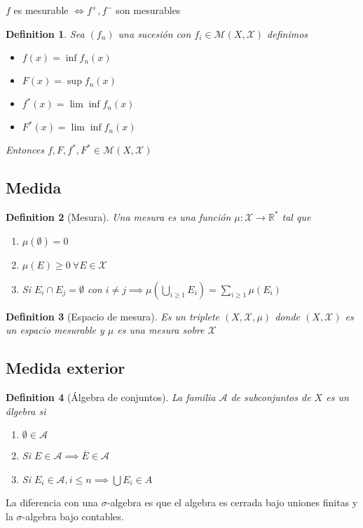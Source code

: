 \documentclass{myclass}
\newtheorem*{definition}{Definition}
\begin{document}
$f$ es mesurable  $\iff f^+, f^-$ son mesurables

\begin{definition}
  Sea $(f_n)$ una sucesión con  $f_i\in \mathcal{M}(X, \mathcal{X})$ definimos
  \begin{itemize}[topsep=-6pt, itemsep=0pt]
    \item $f(x) =  \inf f_n(x)$
    \item $F(x) =  \sup f_n(x)$
    \item $f^*(x) =  \lim \inf f_n(x)$
    \item $F^*(x) =  \lim \inf f_n(x)$
  \end{itemize}
  Entonces $f, F, f^*, F^* \in \mathcal{M}(X, \mathcal{X})$
\end{definition}

\subsection{Medida}
\begin{definition}[Mesura] Una mesura es una función $\mu : \mathcal{X}\to \mathbb{R}^*$ tal que
  \begin{enumerate}[topsep=-6pt, itemsep=0pt]
    \item $\mu(\emptyset) = 0$
	\item  $\mu(E)\ge 0 \ \forall E \in \mathcal{X}$ 
	\item Si $E_i \cap E_j = \emptyset$ con $i\neq j \implies \displaystyle \mu\left( \bigcup_{i\ge 1} E_i \right) = \sum_{i\ge 1}\mu(E_{i})  $
  \end{enumerate}
\end{definition}

\begin{definition}[Espacio de mesura] Es un triplete $(X, \mathcal{X}, \mu)$ donde $(X, \mathcal{X})$ es un espacio mesurable y $\mu$ es una mesura sobre $\mathcal{X}$
\end{definition}

\subsection{Medida exterior}
\begin{definition}[Álgebra de conjuntos]
La familia $\mathcal{A}$ de subconjuntos de $X$ es un álgebra si
\begin{enumerate}[topsep=-6pt, itemsep=0pt]
  \item $\emptyset \in \mathcal{A}$ 
  \item Si $E\in \mathcal{A}\implies \overline{E} \in \mathcal{A}$ 
  \item Si $E_i \in \mathcal{A}, i\le n\implies \bigcup E_i \in A$
\end{enumerate}
\end{definition}
La diferencia con una $\sigma $-algebra es que el algebra es cerrada bajo uniones finitas y la $\sigma$-algebra bajo contables.
\end{document}
